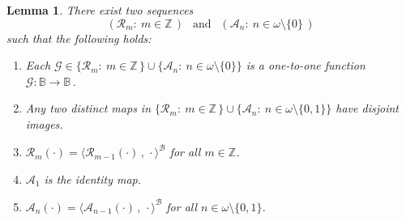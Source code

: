 \documentclass[10pt,a4paper, openany,  oldfontcommands]{memoir}
\newtheorem{lemma} [theorem] {Lemma}
\newtheorem{open problem} [theorem] {Open Problem}
\newtheorem{open question} [theorem] {Open Question}
\begin{document}
\begin{lemma}
There exist  two sequences 
\[
  \left(  \mathcal{R}_m :    \   m  \in \mathbb{Z}  \,  \right)  
\   \    \mbox{  and  }     \      \   
  \left(  \mathcal{A}_n :    \   n  \in  \omega  \setminus  \lbrace 0  \rbrace  \,  \right)  
  \]
 such that the following holds: 
 \begin{enumerate}
 \item  Each  $  \mathcal{G}  \in  \lbrace  \mathcal{R}_m :    \   m  \in \mathbb{Z}  \,   \rbrace  \cup    \lbrace     \mathcal{A}_n :    \   n  \in  \omega  \setminus  \lbrace 0  \rbrace   \rbrace   $  
 is a one-to-one function  $  \mathcal{G}     :   \mathbb{B} \to  \mathbb{B}       \,     $. 
 
 
 
 \item   Any two distinct maps in   $  \lbrace  \mathcal{R}_m :    \   m  \in \mathbb{Z}  \,   \rbrace  \cup    \lbrace     \mathcal{A}_n :    \   n  \in  \omega  \setminus  \lbrace 0 , 1  \rbrace   \rbrace   $    have disjoint images. 
 
 
 
 \item     $  \mathcal{R}_m   \left( \cdot  \right)     =  \langle    \mathcal{R}_{ m-1}   \left( \cdot  \right)      \,  ,  \,  \cdot   \rangle^{  \mathcal{B}  }  $  for all  $  m  \in  \mathbb{Z} $. 
 
 
 
 \item   $  \mathcal{A}_1  $  is the identity map. 
 
  \item     $  \mathcal{A}_{n}   \left( \cdot  \right)     =  \langle    \mathcal{A}_{ n-1}   \left( \cdot  \right)      \,  ,  \,  \cdot   \rangle^{  \mathcal{B}  }  $  for all  $  n  \in   \omega  \setminus  \lbrace 0 , 1  \rbrace      $. 
 \end{enumerate}
\end{lemma}
\end{document}
